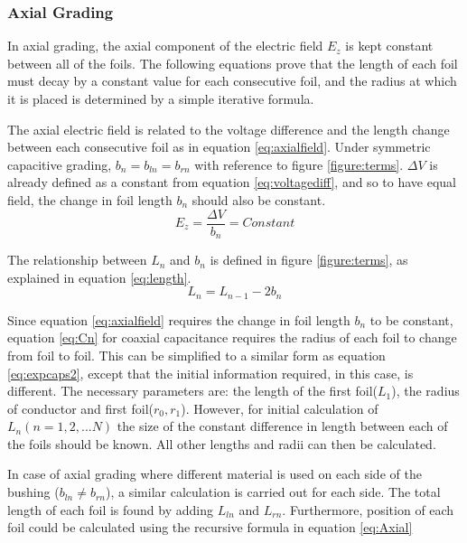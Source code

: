 \subsubsection{Axial Grading}
In axial grading, the axial component of the electric field $E_z$ is kept constant between all of the foils. 
The following equations prove that the length of each foil must decay by a constant value for each consecutive foil, and the radius at which it is placed is determined by a simple iterative formula.

The axial electric field is related to the voltage difference and the length change between each consecutive foil as in equation \ref{eq:axialfield}. 
Under symmetric capacitive grading, $b_n = b_{ln} = b_{rn}$ with reference to figure \ref{figure:terms}. 
$\Delta V$ is already defined as a constant from equation \ref{eq:voltagediff}, and so to have equal field, the change in foil length $b_n$ should also be constant.
\begin{equation}
   \label{eq:axialfield}
   E_z = \displaystyle\frac{\Delta V}{b_n} = Constant
\end{equation}

The relationship between $L_n$ and $b_n$ is defined in figure \ref{figure:terms}, as explained in equation \ref{eq:length}.
\begin{equation}
   \label{eq:length}
   L_n = L_{n-1} - 2b_n
\end{equation}

Since equation \ref{eq:axialfield} requires the change in foil length $b_n$ to be constant, equation \ref{eq:Cn} for coaxial capacitance requires the radius of each foil to change from foil to foil.
This can be simplified to a similar form as equation \ref{eq:expcaps2}, except that the initial information required, in this case, is different. The necessary parameters are: the length of the first foil($L_1$), the radius of conductor and first foil($r_0,r_1$). However, for initial calculation of $L_n (n=1,2,...N)$ the size of the constant difference in length between each of the foils should be known. All other lengths and radii can then be calculated.

In case of axial grading where different material is used on each side of the bushing ($b_{ln} \neq b_{rn}$), a similar calculation is carried out for each side. The total length of each foil is found  by adding $L_{ln}$ and $L_{rn}$. Furthermore, position of each foil could be calculated using the recursive formula in equation \ref{eq:Axial} 

